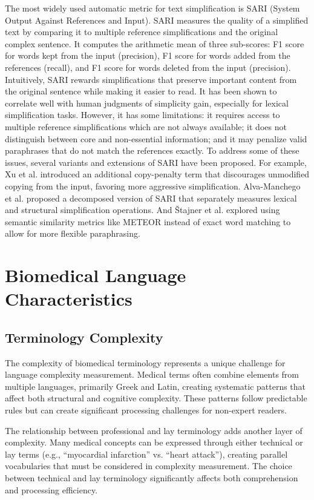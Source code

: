 The most widely used automatic metric for text simplification is SARI (System Output Against References and Input). 
SARI measures the quality of a simplified text by comparing it to multiple reference simplifications and the original complex sentence. It computes the arithmetic mean of three sub-scores: F1 score for words kept from the input (precision), F1 score for words added from the references (recall), and F1 score for words deleted from the input (precision).
Intuitively, SARI rewards simplifications that preserve important content from the original sentence while making it easier to read. It has been shown to correlate well with human judgments of simplicity gain, especially for lexical simplification tasks. However, it has some limitations: it requires access to multiple reference simplifications which are not always available; it does not distinguish between core and non-essential information; and it may penalize valid paraphrases that do not match the references exactly.
To address some of these issues, several variants and extensions of SARI have been proposed. For example, Xu et al. introduced an additional copy-penalty term that discourages unmodified copying from the input, favoring more aggressive simplification. Alva-Manchego et al. proposed a decomposed version of SARI that separately measures lexical and structural simplification operations. And Štajner et al. explored using semantic similarity metrics like METEOR instead of exact word matching to allow for more flexible paraphrasing.

\section{Biomedical Language Characteristics}

\subsection{Terminology Complexity}
The complexity of biomedical terminology represents a unique challenge for language complexity measurement. 
Medical terms often combine elements from multiple languages, primarily Greek and Latin, creating systematic patterns that affect both structural and cognitive complexity. 
These patterns follow predictable rules but can create significant processing challenges for non-expert readers.

The relationship between professional and lay terminology adds another layer of complexity. 
Many medical concepts can be expressed through either technical or lay terms (e.g., ``myocardial infarction'' vs. ``heart attack''), creating parallel vocabularies that must be considered in complexity measurement. 
The choice between technical and lay terminology significantly affects both comprehension and processing efficiency.
